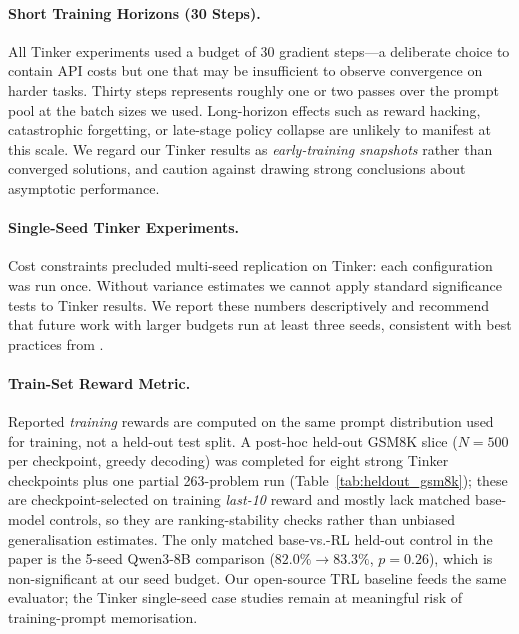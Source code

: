 \documentclass{article}
\begin{document}
\paragraph{Short Training Horizons (30 Steps).}
All Tinker experiments used a budget of 30 gradient steps---a deliberate choice
to contain API costs but one that may be insufficient to observe convergence
on harder tasks. Thirty steps represents roughly one or two passes over the
prompt pool at the batch sizes we used. Long-horizon effects such as reward
hacking, catastrophic forgetting, or late-stage policy collapse are unlikely
to manifest at this scale. We regard our Tinker results as \emph{early-training
snapshots} rather than converged solutions, and caution against drawing strong
conclusions about asymptotic performance.

\paragraph{Single-Seed Tinker Experiments.}
Cost constraints precluded multi-seed replication on Tinker: each configuration
was run once. Without variance estimates we cannot apply standard significance
tests to Tinker results. We report these numbers descriptively and recommend
that future work with larger budgets run at least three seeds, consistent with
best practices from \citet{henderson2018deep}.

\paragraph{Train-Set Reward Metric.}
Reported \emph{training} rewards are computed on the same prompt
distribution used for training, not a held-out test split. A
post-hoc held-out GSM8K slice (\(N{=}500\) per checkpoint, greedy
decoding) was completed for eight strong Tinker checkpoints plus one
partial 263-problem run (Table~\ref{tab:heldout_gsm8k}); these are
checkpoint-selected on training \emph{last-10} reward and mostly
lack matched base-model controls, so they are ranking-stability
checks rather than unbiased generalisation estimates. The only
matched base-vs.-RL held-out control in the paper is the 5-seed
Qwen3-8B comparison ($82.0\% \to 83.3\%$, $p{=}0.26$), which is
non-significant at our seed budget. Our open-source TRL baseline
feeds the same evaluator; the Tinker single-seed case studies
remain at meaningful risk of training-prompt memorisation.
\end{document}

